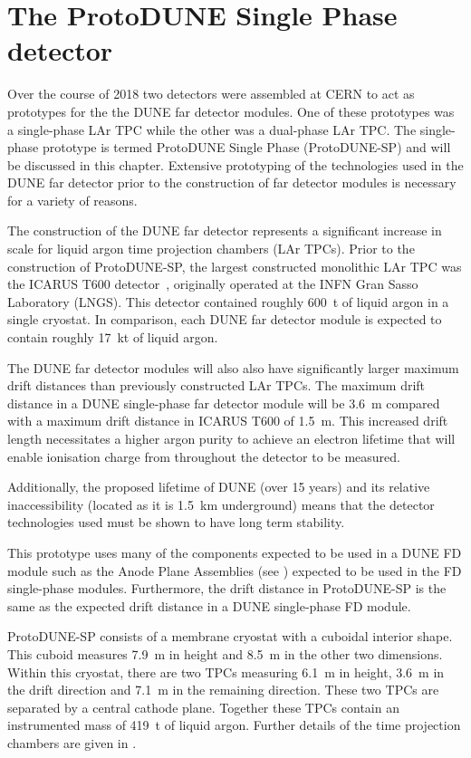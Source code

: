 \chapter{The ProtoDUNE Single Phase detector}
\label{sec:protodune}

Over the course of 2018 two detectors were assembled at CERN to act as prototypes for the the DUNE far detector modules.
One of these prototypes was a single-phase LAr TPC while the other was a dual-phase LAr TPC.
The single-phase prototype is termed ProtoDUNE Single Phase (ProtoDUNE-SP) and will be discussed in this chapter.
Extensive prototyping of the technologies used in the DUNE far detector prior to the construction of far detector modules is necessary for a variety of reasons.

The construction of the DUNE far detector represents a significant increase in scale for liquid argon time projection chambers (LAr TPCs).
Prior to the construction of ProtoDUNE-SP, the largest constructed monolithic LAr TPC was the ICARUS T600 detector~\cite{icarus}, originally operated at the INFN Gran Sasso Laboratory (LNGS).
This detector contained roughly \SI{600}{\tonne} of liquid argon in a single cryostat.
In comparison, each DUNE far detector module is expected to contain roughly \SI{17}{\kilo\tonne} of liquid argon.

The DUNE far detector modules will also also have significantly larger maximum drift distances than previously constructed LAr TPCs.
The maximum drift distance in a DUNE single-phase far detector module will be \SI{3.6}{\m} compared with a maximum drift distance in ICARUS T600 of \SI{1.5}{\m}.
This increased drift length necessitates a higher argon purity to achieve an electron lifetime that will enable ionisation charge from throughout the detector to be measured.

Additionally, the proposed lifetime of DUNE (over 15 years) and its relative inaccessibility (located as it is \SI{1.5}{\kilo\metre} underground) means that the detector technologies used must be shown to have long term stability.

This prototype uses many of the components expected to be used in a DUNE FD module such as the Anode Plane Assemblies (see ) expected to be used in the FD single-phase modules.
Furthermore, the drift distance in ProtoDUNE-SP is the same as the expected drift distance in a DUNE single-phase FD module.

ProtoDUNE-SP consists of a membrane cryostat with a cuboidal interior shape.
This cuboid measures \SI{7.9}{\m} in height and \SI{8.5}{\m} in the other two dimensions.
Within this cryostat, there are two TPCs measuring \SI{6.1}{\m} in height, \SI{3.6}{\m} in the drift direction and \SI{7.1}{\m} in the remaining direction.
These two TPCs are separated by a central cathode plane.
Together these TPCs contain an instrumented mass of \SI{419}{\tonne} of liquid argon.
Further details of the time projection chambers are given in .

